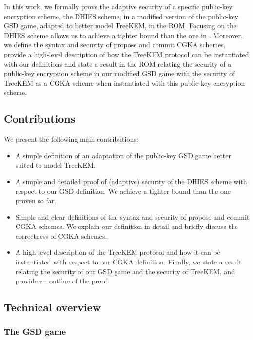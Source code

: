 In this work, we formally prove the adaptive security of a specific public-key encryption scheme, the DHIES scheme, in a modified version of the public-key GSD game, adapted to better model TreeKEM, in the ROM. Focusing on the DHIES scheme allows us to achieve a tighter bound than the one in \cite{ttkem}. Moreover, we define the syntax and security of propose and commit CGKA schemes, provide a high-level description of how the TreeKEM protocol can be instantiated with our definitions and state a result in the ROM relating the security of a public-key encryption scheme in our modified GSD game with the security of TreeKEM as a CGKA scheme when instantiated with this public-key encryption scheme.

\subsection{Contributions}

We present the following main contributions:
\begin{itemize}
	\item A simple definition of an adaptation of the public-key GSD game better suited to model TreeKEM.
	\item A simple and detailed proof of (adaptive) security of the DHIES scheme with respect to our GSD definition. We achieve a tighter bound than the one proven so far.
	\item Simple and clear definitions of the syntax and security of propose and commit CGKA schemes. We explain our definition in detail and briefly discuss the correctness of CGKA schemes.
	\item A high-level description of the TreeKEM protocol and how it can be instantiated with respect to our CGKA definition. Finally, we state a result relating the security of our GSD game and the security of TreeKEM, and provide an outline of the proof.
\end{itemize}

\subsection{Technical overview}

\subsubsection{The GSD game}

